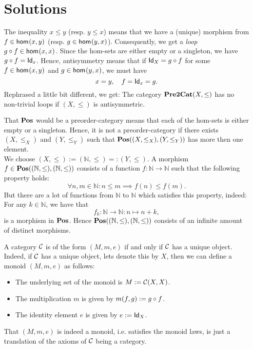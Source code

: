 \section{Solutions}
\label{sec:solutions}

\begin{solution}\label{sol:post_antisymmetry}
The inequality $x\leq y$ (resp. $y\leq x$) means that we have a (unique) morphism from $f\in \Hom{x}{y}$ (resp. $g\in \Hom{y}{x}$). Consequently, we get a \textit{loop} $\co{f}{g} \in \Hom{x}{x}$. Since the hom-sets are either empty or a singleton, we have $\co{f}{g} = \Id[x]$. Hence, antisymmetry means that if $\Id[X] = \co{f}{g}$ for some $f\in \Hom{x}{y}$ and $g\in \Hom{y}{x}$, we must have 
\[x=y,\quad f = \Id[x] = g.\]
Rephrased a little bit different, we get: The category $\PREtoCAT(X,\leq)$ has no non-trivial loops if $(X,\leq)$ is antisymmetric.
\end{solution}

\begin{solution}\label{sol:POS_isnt_a_posetcat}
That $\POS$ would be a preorder-category means that each of the hom-sets is either empty or a singleton. Hence, it is not a preorder-category if there exists $(X,\leq_X)$ and $(Y,\leq_Y)$ such that $\CHom{\POS}{(X,\leq_X)}{(Y,\leq_Y)}$ has more then one element.\\
We choose $(X,\leq) := (\mathbb{N},\leq) =: (Y,\leq)$. A morphism $f\in \CHom{\POS}{(\mathbb{N},\leq)}{(\mathbb{N},\leq)}$ consists of a function $f:\mathbb{N}\to\mathbb{N}$ such that the following property holds:
\[
\forall n,m\in\mathbb{N}: n\leq m \implies f(n)\leq f(m).
\]
But there are a lot of functions from $\mathbb{N}$ to $\mathbb{N}$ which satisfies this property, indeed: For any $k\in\mathbb{N}$, we have that
\[
f_k : \mathbb{N}\to\mathbb{N}: n\mapsto n+k,
\]
is a morphism in $\POS$. Hence $\CHom{\POS}{(\mathbb{N},\leq)}{(\mathbb{N},\leq)}$ consists of an infinite amount of distinct morphisms.
\end{solution} 

\begin{solution}\label{sol:categories_coming_from_monoids}
A category $\CC$ is of the form $(M,m,e)$ if and only if $\CC$ has a unique object. Indeed, if $\CC$ has a unique object, lets denote this by $X$, then we can define a monoid $(M,m,e)$ as follows:
\begin{itemize}
\item The underlying set of the monoid is $M := \CHom{\CC}{X}{X}$.
\item The multiplication $m$ is given by $m(f,g) := \co{f}{g}$.
\item The identity element $e$ is given by $e := \Id[X]$.
\end{itemize}
That $(M,m,e)$ is indeed a monoid, i.e. satisfies the monoid laws, is just a translation of the axioms of $\CC$ being a category.
\end{solution}


